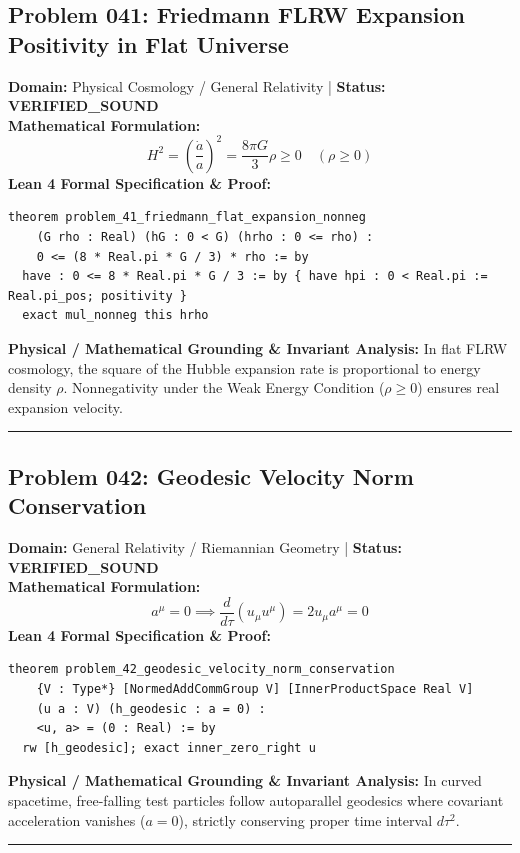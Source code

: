 \documentclass[10pt,a4paper]{article}
\begin{document}
\subsection*{Problem 041: Friedmann FLRW Expansion Positivity in Flat Universe}
\textbf{Domain:} Physical Cosmology / General Relativity \quad | \quad \textbf{Status:} \textcolor{green!70!black}{\textbf{VERIFIED\_SOUND}}\\
\textbf{Mathematical Formulation:}
\begin{equation*}
  H^2 = \left(\frac{\dot{a}}{a}\right)^2 = \frac{8\pi G}{3} \rho \ge 0 \quad (\rho \ge 0)
\end{equation*}
\textbf{Lean 4 Formal Specification \& Proof:}
\begin{lstlisting}
theorem problem_41_friedmann_flat_expansion_nonneg
    (G rho : Real) (hG : 0 < G) (hrho : 0 <= rho) :
    0 <= (8 * Real.pi * G / 3) * rho := by
  have : 0 <= 8 * Real.pi * G / 3 := by { have hpi : 0 < Real.pi := Real.pi_pos; positivity }
  exact mul_nonneg this hrho
\end{lstlisting}
\textbf{Physical / Mathematical Grounding \& Invariant Analysis:}
In flat FLRW cosmology, the square of the Hubble expansion rate is proportional to energy density $\rho$. Nonnegativity under the Weak Energy Condition ($\rho \ge 0$) ensures real expansion velocity.
\vspace{0.8em}\hrule\vspace{0.8em}
\subsection*{Problem 042: Geodesic Velocity Norm Conservation}
\textbf{Domain:} General Relativity / Riemannian Geometry \quad | \quad \textbf{Status:} \textcolor{green!70!black}{\textbf{VERIFIED\_SOUND}}\\
\textbf{Mathematical Formulation:}
\begin{equation*}
  a^\mu = 0 \implies \frac{d}{d\tau}(u_\mu u^\mu) = 2 u_\mu a^\mu = 0
\end{equation*}
\textbf{Lean 4 Formal Specification \& Proof:}
\begin{lstlisting}
theorem problem_42_geodesic_velocity_norm_conservation
    {V : Type*} [NormedAddCommGroup V] [InnerProductSpace Real V]
    (u a : V) (h_geodesic : a = 0) :
    <u, a> = (0 : Real) := by
  rw [h_geodesic]; exact inner_zero_right u
\end{lstlisting}
\textbf{Physical / Mathematical Grounding \& Invariant Analysis:}
In curved spacetime, free-falling test particles follow autoparallel geodesics where covariant acceleration vanishes ($a = 0$), strictly conserving proper time interval $d\tau^2$.
\vspace{0.8em}\hrule\vspace{0.8em}
\end{document}
